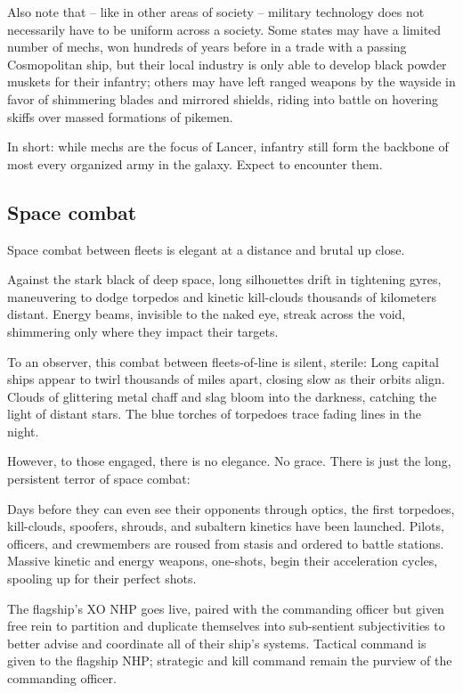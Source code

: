 Also note that -- like in other areas of society -- military technology does not necessarily have to
be uniform across a society. Some states may have a limited number of mechs, won hundreds of
years before in a trade with a passing Cosmopolitan ship, but their local industry is only able to
develop black powder muskets for their infantry; others may have left ranged weapons by the
wayside in favor of shimmering blades and mirrored shields, riding into battle on hovering skiffs
over massed formations of pikemen.

In short: while mechs are the focus of Lancer, infantry still form the backbone of most every
organized army in the galaxy. Expect to encounter them.

\subsection{Space combat}

Space combat between fleets is elegant at a distance and brutal up close.

Against the stark black of deep space, long silhouettes drift in tightening gyres, maneuvering to
dodge torpedos and kinetic kill-clouds thousands of kilometers distant. Energy beams, invisible
to the naked eye, streak across the void, shimmering only where they impact their targets.

To an observer, this combat between fleets-of-line is silent, sterile: Long capital ships appear to
twirl thousands of miles apart, closing slow as their orbits align. Clouds of glittering metal chaff
and slag bloom into the darkness, catching the light of distant stars. The blue torches of
torpedoes trace fading lines in the night.

However, to those engaged, there is no elegance. No grace. There is just the long, persistent
terror of space combat:

Days before they can even see their opponents through optics, the first torpedoes, kill-clouds,
spoofers, shrouds, and subaltern kinetics have been launched. Pilots, officers, and
crewmembers are roused from stasis and ordered to battle stations. Massive kinetic and energy
weapons, one-shots, begin their acceleration cycles, spooling up for their perfect shots.

The flagship’s XO NHP goes live, paired with the commanding officer but given free rein to
partition and duplicate themselves into sub-sentient subjectivities to better advise and
coordinate all of their ship’s systems. Tactical command is given to the flagship NHP; strategic
and kill command remain the purview of the commanding officer.


